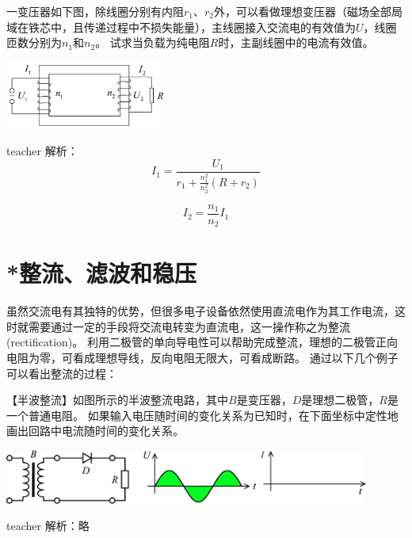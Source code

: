 \begin{example}

一变压器如下图，除线圈分别有内阻$r_1$、$r_2$外，可以看做理想变压器（磁场全部局域在铁芯中，且传递过程中不损失能量），主线圈接入交流电的有效值为$U$，线圈匝数分别为$n_1$和$n_2$。
试求当负载为纯电阻$R $时，主副线圈中的电流有效值。
\begin{flushright}
\includegraphics[width = 0.4\textwidth]{images/mag-42.pdf} 
\end{flushright}
\begin{taggedblock}{teacher}
\noindent
解析：
\[I_1=\frac{U_1}{r_1+\frac{n_1^2}{n_2^2}(R+r_2)}\]

\[I_2=\frac{n_1}{n_2}I_1\]
\end{taggedblock}
\end{example}

\section{*整流、滤波和稳压}

虽然交流电有其独特的优势，但很多电子设备依然使用直流电作为其工作电流，这时就需要通过一定的手段将交流电转变为直流电，这一操作称之为{\heiti 整流}(rectification)。
利用二极管的单向导电性可以帮助完成整流，理想的二极管正向电阻为零，可看成理想导线，反向电阻无限大，可看成断路。
通过以下几个例子可以看出整流的过程：


\begin{example}

【半波整流】如图所示的半波整流电路，其中$B$是变压器，$D$是理想二极管，$R$是一个普通电阻。
如果输入电压随时间的变化关系为已知时，在下面坐标中定性地画出回路中电流随时间的变化关系。
\begin{center}
\includegraphics[width = 0.9\textwidth]{images/alt-current-7.pdf} 
\end{center}
\begin{taggedblock}{teacher}
\noindent
解析：略
\end{taggedblock}
\end{example}



